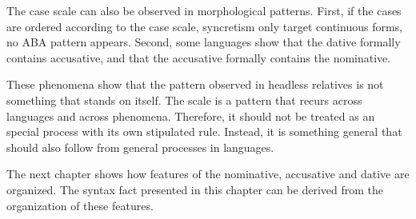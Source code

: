 The case scale can also be observed in morphological patterns. First, if the cases are ordered according to the case scale, syncretism only target continuous forms, no ABA pattern appears. Second, some languages show that the dative formally contains accusative, and that the accusative formally contains the nominative.

These phenomena show that the pattern observed in headless relatives is not something that stands on itself. The scale is a pattern that recurs across languages and across phenomena. Therefore, it should not be treated as an special process with its own stipulated rule. Instead, it is something general that should also follow from general processes in languages.

The next chapter shows how features of the nominative, accusative and dative are organized. The syntax fact presented in this chapter can be derived from the organization of these features.
